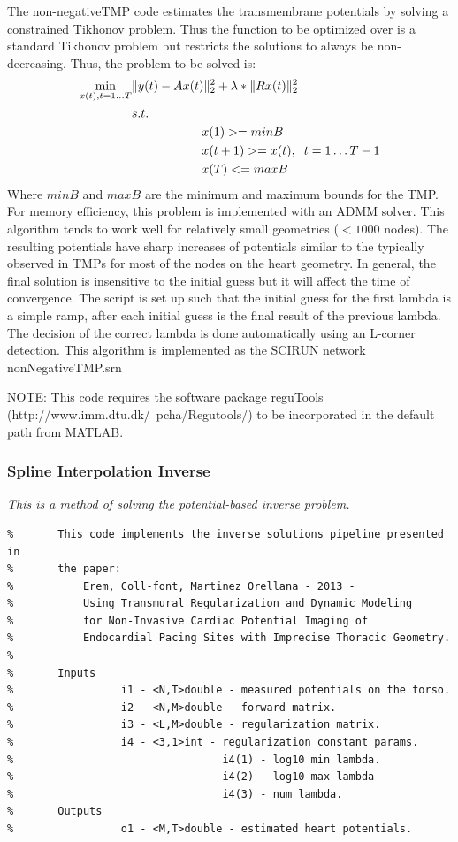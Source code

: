 The non-negativeTMP code estimates the transmembrane potentials by solving a constrained Tikhonov problem.
Thus the function to be optimized over is a standard Tikhonov problem but restricts the solutions to always be non-decreasing.
Thus, the problem to be solved is:
\begin{equation}\begin{split}
		\min_{x(t), t=1\dots T} &\|y(t) - Ax(t)\|_2^2 + \lambda*\|Rx(t)\|_2^2 \\
		&s.t.\\
   		&\hspace{2cm}x(1) >= minB\\
     	&\hspace{2cm}x(t+1) >= x(t), \hspace{.2cm}t=1\dots T-1\\
     	&\hspace{2cm}x(T) <= maxB
\end{split}
\end{equation}
Where $minB$ and $maxB$ are the minimum and maximum bounds for the TMP.
For memory efficiency, this problem is implemented with an ADMM solver.
This algorithm tends to work well for relatively small geometries ($<1000$ nodes).
The resulting potentials have sharp increases of potentials similar to the typically observed in TMPs 
for most of the nodes on the heart geometry.
In general, the final solution is insensitive to the initial guess but it will affect the time of convergence.
The script is set up such that the initial guess for the first lambda is a simple ramp, after each initial guess is the final result of the previous lambda. 
The decision of the correct lambda is done automatically using an L-corner detection.
This algorithm is implemented as the SCIRUN network nonNegativeTMP.srn

NOTE: This code requires the software package reguTools (http://www.imm.dtu.dk/~pcha/Regutools/) to be incorporated in the default path from MATLAB.

\subsubsection{Spline Interpolation Inverse}

\vspace{5pt}\textit{This is a method of solving the potential-based inverse problem.}\vspace{5pt}
\begin{verbatim}
%		This code implements the inverse solutions pipeline presented in
%		the paper:
%	        Erem, Coll-font, Martinez Orellana - 2013 - 
%	        Using Transmural Regularization and Dynamic Modeling 
%	        for Non-Invasive Cardiac Potential Imaging of 
%	        Endocardial Pacing Sites with Imprecise Thoracic Geometry.
%
%		Inputs
%				  i1 - <N,T>double - measured potentials on the torso.
%				  i2 - <N,M>double - forward matrix.
%				  i3 - <L,M>double - regularization matrix.
%				  i4 - <3,1>int - regularization constant params.
%				                  i4(1) - log10 min lambda.
%				                  i4(2) - log10 max lambda
%				                  i4(3) - num lambda.
%		Outputs
%				  o1 - <M,T>double - estimated heart potentials.
\end{verbatim}

